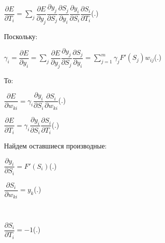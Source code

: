 	\formulaspace \par \redline 
	$\dfrac{\partial E}{\partial T_{i}} =  \sum \limits _{j}^{} \dfrac{\partial E}{\partial y_j} \dfrac{\partial y_j}{\partial S_j} \dfrac{\partial S_j}{\partial y_{i}}\dfrac{\partial y_i}{\partial S_i} \dfrac{\partial S_i}{\partial T_{i}}$\hfill (\thechaptercntr .\theformulacntr) \redline
	\formulaspace \addtocounter{formulacntr}{1}
	
	\par \redline Поскольку:
	 
	\formulaspace \par \redline 
	$\gamma_{i} =  \dfrac{\partial E}{\partial y_i} = \sum \limits _{j}^{} \dfrac{\partial E}{\partial y_j} \dfrac{\partial y_j}{\partial S_j} \dfrac{\partial S_j}{\partial y_i} = \sum \limits _{j=1}^{m} \gamma_{j} F'(S_{j}) w_{ij}$\hfill (\thechaptercntr .\theformulacntr) \redline
	\formulaspace \addtocounter{formulacntr}{1}
	
	\par \redline То:
	
		\formulaspace \par \redline 
	$\dfrac{\partial E}{\partial w_{ki}} =  \gamma_{i} \dfrac{\partial y_i}{\partial S_i} \dfrac{\partial S_i}{\partial w_{ki}}$\hfill (\thechaptercntr .\theformulacntr) \redline
	\formulaspace \addtocounter{formulacntr}{1}
	
	\formulaspace \par \redline 
	$\dfrac{\partial E}{\partial T_{i}} =  \gamma_{i}\dfrac{\partial y_i}{\partial S_i} \dfrac{\partial S_i}{\partial T_{i}}$\hfill (\thechaptercntr .\theformulacntr) \redline
	\formulaspace \addtocounter{formulacntr}{1}
	
	\par \redline Найдем оставшиеся производные:
	
		\formulaspace \par \redline 
	$\dfrac{\partial y_i}{\partial S_i} =  F'(S_{i})$\hfill (\thechaptercntr .\theformulacntr) \redline
	\formulaspace \addtocounter{formulacntr}{1}
	
	\formulaspace \par \redline 
	$\dfrac{\partial S_i}{\partial w_{ki}} =  y_{k}$\hfill (\thechaptercntr .\theformulacntr) \redline
	\formulaspace \addtocounter{formulacntr}{1}\\
	
	\formulaspace \par \redline 
	$\dfrac{\partial S_i}{\partial T_{i}} = -1 $\hfill (\thechaptercntr .\theformulacntr) \redline
	\formulaspace \addtocounter{formulacntr}{1}
	
